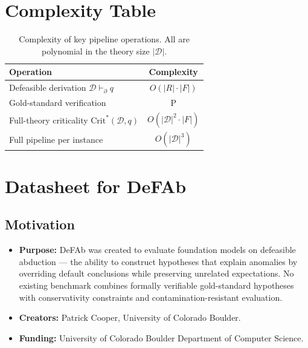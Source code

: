 \documentclass{article}
\theoremstyle{definition}
\newcommand{\D}{\mathcal{D}}
\newcommand{\CritStar}{\mathrm{Crit}^{*}}
\newcommand{\pPartial}{\vdash_{\partial}}
\begin{document}
\section{Complexity Table}\label{app:complexity}

\begin{table}[h]
\centering
\small
\caption{Complexity of key pipeline operations. All are polynomial in the theory size $|\D|$.}
\label{tab:complexity}
\begin{tabular}{@{}lc@{}}
\toprule
Operation & Complexity \\
\midrule
Defeasible derivation $\D \pPartial q$ & $O(|R| \cdot |F|)$ \\
Gold-standard verification & P \\
Full-theory criticality $\CritStar(\D, q)$ & $O(|\D|^2 \cdot |F|)$ \\
Full pipeline per instance & $O(|\D|^3)$ \\
\bottomrule
\end{tabular}
\end{table}


\section{Datasheet for DeFAb}\label{app:datasheet}

\subsection*{Motivation}

\begin{itemize}[nosep]
\item \textbf{Purpose:} DeFAb was created to evaluate foundation models on defeasible abduction --- the ability to construct hypotheses that explain anomalies by overriding default conclusions while preserving unrelated expectations. No existing benchmark combines formally verifiable gold-standard hypotheses with conservativity constraints and contamination-resistant evaluation.
\item \textbf{Creators:} Patrick Cooper, University of Colorado Boulder.
\item \textbf{Funding:} University of Colorado Boulder Department of Computer Science.
\end{itemize}
\end{document}
